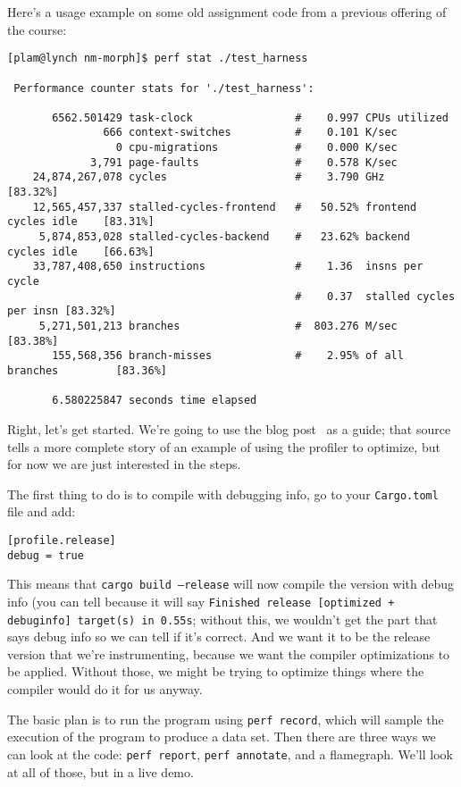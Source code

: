 \noindent
Here's a usage example on some old assignment code from a previous offering of the course:
\begin{lstlisting}[basicstyle=\scriptsize]
[plam@lynch nm-morph]$ perf stat ./test_harness

 Performance counter stats for './test_harness':

       6562.501429 task-clock                #    0.997 CPUs utilized          
               666 context-switches          #    0.101 K/sec                  
                 0 cpu-migrations            #    0.000 K/sec                  
             3,791 page-faults               #    0.578 K/sec                  
    24,874,267,078 cycles                    #    3.790 GHz                     [83.32%]
    12,565,457,337 stalled-cycles-frontend   #   50.52% frontend cycles idle    [83.31%]
     5,874,853,028 stalled-cycles-backend    #   23.62% backend  cycles idle    [66.63%]
    33,787,408,650 instructions              #    1.36  insns per cycle        
                                             #    0.37  stalled cycles per insn [83.32%]
     5,271,501,213 branches                  #  803.276 M/sec                   [83.38%]
       155,568,356 branch-misses             #    2.95% of all branches         [83.36%]

       6.580225847 seconds time elapsed
\end{lstlisting} %

Right, let's get started. We're going to use the blog post~\cite{rustflamegraph} as a guide; that source tells a more complete story of an example of using the profiler to optimize, but for now we are just interested in the steps.

The first thing to do is to compile with debugging info, go to your \texttt{Cargo.toml} file and add:
\begin{verbatim}
[profile.release]
debug = true
\end{verbatim}

This means that \texttt{cargo build --release} will now compile the version with debug info (you can tell because it will say \texttt{Finished release [optimized + debuginfo] target(s) in 0.55s}; without this, we wouldn't get the part that says debug info so we can tell if it's correct. And we want it to be the release version that we're instrumenting, because we want the compiler optimizations to be applied. Without those, we might be trying to optimize things where the compiler would do it for us anyway.

The basic plan is to run the program using \texttt{perf record}, which will sample the execution of the program to produce a data set. Then there are three ways we can look at the code: \texttt{perf report}, \texttt{perf annotate}, and a flamegraph. We'll look at all of those, but in a live demo.


